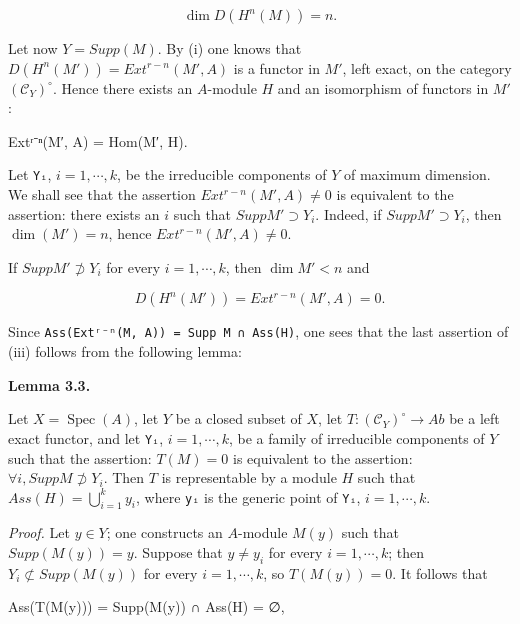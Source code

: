 \documentclass[
]{article}
\newenvironment{Shaded}{}{}
\newcommand{\NormalTok}[1]{#1}
\begin{document}
\[
\dim D(H^{n}(M)) = n.
\]

Let now \(Y = Supp(M)\). By (i) one knows that
\(D(H^{n}(M')) = Ext^{r-n}(M', A)\) is a functor in \(M'\), left exact,
on the category \((\mathcal{C}_{Y})^{\circ}\). Hence there exists an
\(A\)-module \(H\) and an isomorphism of functors in \(M'\):

\begin{Shaded}
\begin{Highlighting}[]
\NormalTok{Extʳ⁻ⁿ(M′, A) = Hom(M′, H).}
\end{Highlighting}
\end{Shaded}

Let \texttt{Yᵢ}, \(i = 1, \cdots, k\), be the irreducible components of
\(Y\) of maximum dimension. We shall see that the assertion
\(Ext^{r-n}(M', A) \neq 0\) is equivalent to the assertion: there exists
an \(i\) such that \(Supp M' \supset Y_{i}\). Indeed, if
\(Supp M' \supset Y_{i}\), then \(\dim(M') = n\), hence
\(Ext^{r-n}(M', A) \neq 0\).

If \(Supp M' \not\supset Y_{i}\) for every \(i = 1, \cdots, k\), then
\(\dim M' < n\) and

\[
D(H^{n}(M')) = Ext^{r-n}(M', A) = 0.
\]

Since \texttt{Ass(Extʳ⁻ⁿ(M,\ A))\ =\ Supp\ M\ ∩\ Ass(H)}, one sees that
the last assertion of (iii) follows from the following lemma:

\textbf{Lemma 3.3.}

Let \(X = \operatorname{Spec}(A)\), let \(Y\) be a closed subset of
\(X\), let \(T: (\mathcal{C}_{Y})^{\circ} \to Ab\) be a left exact
functor, and let \texttt{Yᵢ}, \(i = 1, \cdots, k\), be a family of
irreducible components of \(Y\) such that the assertion: \(T(M) = 0\) is
equivalent to the assertion: \(\forall i, Supp M \not\supset Y_{i}\).
Then \(T\) is representable by a module \(H\) such that
\(Ass(H) = \bigcup^{k}_{i=1} {y_{i}}\), where \texttt{yᵢ} is the generic
point of \texttt{Yᵢ}, \(i = 1, \cdots, k\).

\emph{Proof.} Let \(y \in Y\); one constructs an \(A\)-module \(M(y)\)
such that \(Supp(M(y)) = {y}\). Suppose that \(y \neq y_{i}\) for every
\(i = 1, \cdots, k\); then \(Y_{i} \not\subset Supp(M(y))\) for every
\(i = 1, \cdots, k\), so \(T(M(y)) = 0\). It follows that

\begin{Shaded}
\begin{Highlighting}[]
\NormalTok{Ass(T(M(y))) = Supp(M(y)) ∩ Ass(H) = ∅,}
\end{Highlighting}
\end{Shaded}
\end{document}
